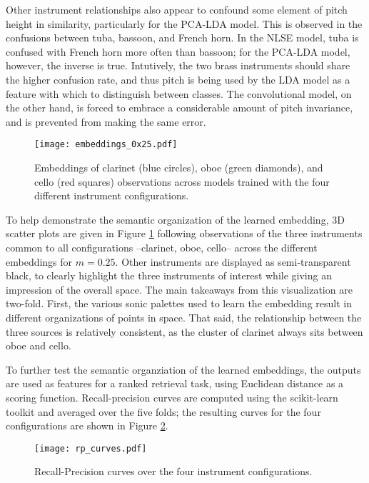 Other instrument relationships also appear to confound some element of pitch height in similarity, particularly for the PCA-LDA model.
This is observed in the confusions between tuba, bassoon, and French horn.
In the NLSE model, tuba is confused with French horn more often than bassoon; for the PCA-LDA model, however, the inverse is true.
Intutively, the two brass instruments should share the higher confusion rate, and thus pitch is being used by the LDA model as a feature with which to distinguish between classes.
The convolutional model, on the other hand, is forced to embrace a considerable amount of pitch invariance, and is prevented from making the same error.

\begin{figure}[h]
\centering
\texttt{[image: embeddings\_0x25.pdf]}
\caption{Embeddings of clarinet (blue circles), oboe (green diamonds), and cello (red squares) observations across models trained with the four different instrument configurations.}
\label{fig:embeddings_0x25}
\end{figure}

To help demonstrate the semantic organization of the learned embedding, 3D scatter plots are given in Figure \ref{fig:embeddings_0x25} following observations of the three instruments common to all configurations --clarinet, oboe, cello-- across the different embeddings for $m = 0.25$.
Other instruments are displayed as semi-transparent black, to clearly highlight the three instruments of interest while giving an impression of the overall space.
The main takeaways from this visualization are two-fold.
First, the various sonic palettes used to learn the embedding result in different organizations of points in space.
That said, the relationship between the three sources is relatively consistent, as the cluster of clarinet always sits between oboe and cello.


To further test the semantic organziation of the learned embeddings, the outputs are used as features for a ranked retrieval task, using Euclidean distance as a scoring function.
Recall-precision curves are computed using the scikit-learn toolkit and averaged over the five folds; the resulting curves for the four configurations are shown in Figure \ref{fig:rp_curves}.

\begin{figure}[h]
\centering
\texttt{[image: rp\_curves.pdf]}
\caption{Recall-Precision curves over the four instrument configurations.}
\label{fig:rp_curves}
\end{figure}

